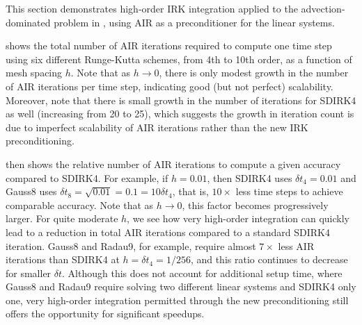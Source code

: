 \documentclass[review]{siamart}
\begin{document}
This section demonstrates high-order IRK integration applied to the advection-dominated
problem in , using AIR as a preconditioner for the linear
systems.

 shows the total number of AIR iterations required to
compute one time step using six different Runge-Kutta schemes, from 4th
to 10th order, as a function of mesh spacing $h$. Note that as $h\to 0$,
there is only modest growth in the number of AIR iterations per time step,
indicating good (but not perfect) scalability.
Moreover, note that there is small growth in the number of iterations for
SDIRK4 as well (increasing from 20 to 25), which suggests the growth in
iteration count is due to imperfect scalability of AIR iterations rather
than the new IRK preconditioning.

 then shows the relative number of AIR iterations to
compute a given accuracy compared to SDIRK4. For example, if $h=0.01$,
then SDIRK4 uses $\delta t_4 = 0.01$ and Gauss8 uses $\delta t_8 =
\sqrt{0.01} = 0.1 = 10\delta t_4$, that is, $10\times$ less time steps to
achieve comparable accuracy. Note that as $h\to 0$, this factor becomes progressively
larger. For quite moderate $h$, we see how very high-order integration
can quickly lead to a reduction in total AIR iterations compared to a
standard SDIRK4 iteration. Gauss8 and Radau9, for example, require almost
$7\times$ less AIR iterations than SDIRK4 at $h =\delta t_4 = 1/256$,
and this ratio continues to decrease for smaller $\delta t$. Although this
does not account for additional setup time, where Gauss8 and Radau9 require
solving two different linear systems and SDIRK4 only one, very high-order
integration permitted through the new preconditioning still offers the
opportunity for significant speedups.
\end{document}
